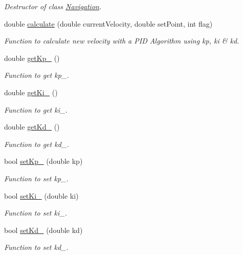\begin{DoxyCompactItemize}
\begin{DoxyCompactList}\small\item\em Destructor of class \hyperlink{class_navigation}{Navigation}. \end{DoxyCompactList}\item 
double \hyperlink{class_navigation_a0eb1833ccc91d6fd5822938797686708}{calculate} (double current\+Velocity, double set\+Point, int flag)
\begin{DoxyCompactList}\small\item\em Function to calculate new velocity with a P\+ID Algorithm using kp, ki \& kd. \end{DoxyCompactList}\item 
double \hyperlink{class_navigation_ab1469d74f4838a9d32a8647d22701f9f}{get\+Kp\+\_\+} ()
\begin{DoxyCompactList}\small\item\em Function to get kp\+\_\+. \end{DoxyCompactList}\item 
double \hyperlink{class_navigation_a1a84392d6cce3f60df452ab482b5647c}{get\+Ki\+\_\+} ()
\begin{DoxyCompactList}\small\item\em Function to get ki\+\_\+. \end{DoxyCompactList}\item 
double \hyperlink{class_navigation_ac6441bb601483166ef7a8081b76f634d}{get\+Kd\+\_\+} ()
\begin{DoxyCompactList}\small\item\em Function to get kd\+\_\+. \end{DoxyCompactList}\item 
bool \hyperlink{class_navigation_a6dd95f46ff4ecc69895452a1879c30af}{set\+Kp\+\_\+} (double kp)
\begin{DoxyCompactList}\small\item\em Function to set kp\+\_\+. \end{DoxyCompactList}\item 
bool \hyperlink{class_navigation_a539d10206ceb162171e39c36e8aa8f0f}{set\+Ki\+\_\+} (double ki)
\begin{DoxyCompactList}\small\item\em Function to set ki\+\_\+. \end{DoxyCompactList}\item 
bool \hyperlink{class_navigation_a4986e4357d9707ddf92cf8f559ef3dce}{set\+Kd\+\_\+} (double kd)
\begin{DoxyCompactList}\small\item\em Function to set kd\+\_\+. \end{DoxyCompactList}\end{DoxyCompactItemize}
